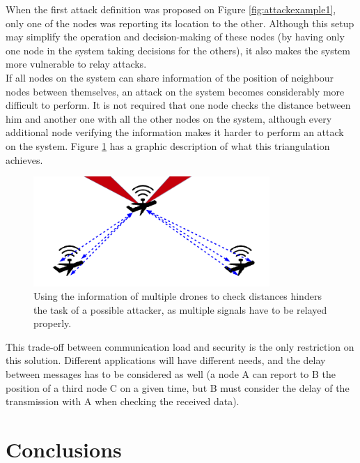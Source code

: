 \documentclass{article}
\begin{document}
When the first attack definition was proposed on Figure \ref{fig:attackexample1}, only one of the nodes was reporting its location to the other. Although this setup may simplify the operation and decision-making of these nodes (by having only one node in the system taking decisions for the others), it also makes the system more vulnerable to relay attacks.\\

If all nodes on the system can share information of the position of neighbour nodes between themselves, an attack on the system becomes considerably more difficult to perform. It is not required that one node checks the distance between him and another one with all the other nodes on the system, although every additional node verifying the information makes it harder to perform an attack on the system. Figure \ref{fig:attackexample4} has a graphic description of what this triangulation achieves.\\

  \begin{figure}[h!]
  \centering
    \includegraphics[width=0.8\textwidth]{images/attack4.png}
  \caption{Using the information of multiple drones to check distances hinders the task of a possible attacker, as multiple signals have to be relayed properly.}
  \label{fig:attackexample4}
\end{figure}

This trade-off between communication load and security is the only restriction on this solution. Different applications will have different needs, and the delay between messages has to be considered as well (a node A can report to B the position of a third node C on a given time, but B must consider the delay of the transmission with A when checking the received data).\\










\section{Conclusions}
\label{sec:conclusions}
\end{document}
